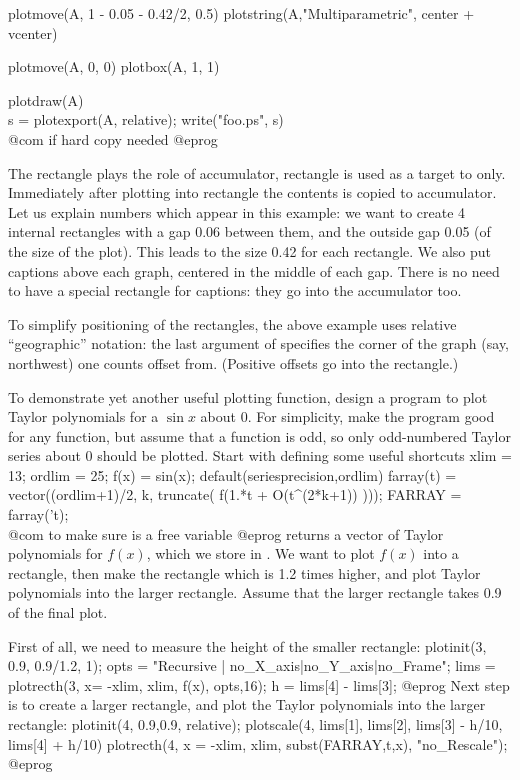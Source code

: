   plotmove(A, 1 - 0.05 - 0.42/2, 0.5)
  plotstring(A,"Multiparametric", center + vcenter)

  plotmove(A, 0, 0)
  plotbox(A, 1, 1)

  plotdraw(A)
  \\ s = plotexport(A, relative); write("foo.ps", s) \\ @com if hard copy needed
@eprog

The rectangle  plays the role of accumulator, rectangle  is
used as a target to  only.  Immediately after plotting into
rectangle  the contents is copied to accumulator.  Let us explain
numbers which appear in this example: we want to create 4 internal rectangles
with a gap 0.06 between them, and the outside gap 0.05 (of the size of the
plot).  This leads to the size 0.42 for each rectangle.  We also
put captions above each graph, centered in the middle of each gap.  There
is no need to have a special rectangle for captions: they go into the
accumulator too.

To simplify positioning of the rectangles, the above example uses relative
``geographic'' notation: the last argument of  specifies the
corner of the graph (say, northwest) one counts offset from. (Positive
offsets go into the rectangle.)

To demonstrate yet another useful plotting function, design a program to
plot Taylor polynomials for a $\sin x$ about 0.  For simplicity, make the
program good for any function, but assume that a function is odd, so only
odd-numbered Taylor series about 0 should be plotted.  Start with defining
some useful shortcuts
\bprog
  xlim = 13;  ordlim = 25;  f(x) = sin(x);
  default(seriesprecision,ordlim)
  farray(t) = vector((ordlim+1)/2, k, truncate( f(1.*t + O(t^(2*k+1)) )));
  FARRAY = farray('t);  \\@com{} to make sure  is a free variable
@eprog\noindent
{} returns a vector of Taylor polynomials for $f(x)$, which we
store in .  We want to plot $f(x)$ into a rectangle, then make
the rectangle which is 1.2 times higher, and plot Taylor polynomials into the
larger rectangle.  Assume that the larger rectangle takes 0.9 of the final
plot.

First of all, we need to measure the height of the smaller rectangle:
\bprog
  plotinit(3, 0.9, 0.9/1.2, 1);
  opts = "Recursive | no_X_axis|no_Y_axis|no_Frame";
  lims = plotrecth(3, x= -xlim, xlim, f(x), opts,16);
  h = lims[4] - lims[3];
@eprog\noindent
Next step is to create a larger rectangle, and plot the Taylor polynomials
into the larger rectangle:
\bprog
  plotinit(4, 0.9,0.9, relative);
  plotscale(4, lims[1], lims[2], lims[3] - h/10, lims[4] + h/10)
  plotrecth(4, x = -xlim, xlim, subst(FARRAY,t,x), "no_Rescale");
@eprog

